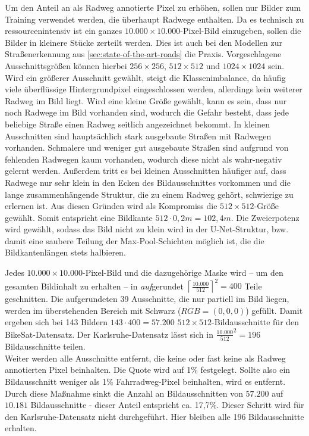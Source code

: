 Um den Anteil an als Radweg annotierte Pixel zu erhöhen, sollen nur Bilder zum Training verwendet werden,
die überhaupt Radwege enthalten. Da es technisch zu ressourcenintensiv ist ein ganzes 
$10.000{\times}10.000$-Pixel-Bild einzugeben, sollen die Bilder in kleinere Stücke zerteilt werden. 
Dies ist auch bei den Modellen zur Straßenerkennung aus \autoref{sec:state-of-the-art-roads} die Praxis. 
Vorgeschlagene Ausschnittsgrößen können hierbei $256{\times}256$, $512{\times}512$ und $1024{\times}1024$ sein. 
Wird ein größerer Ausschnitt gewählt, steigt die Klassenimbalance, da häufig viele überflüssige 
Hintergrundpixel eingeschlossen werden, allerdings kein weiterer Radweg im Bild liegt. 
Wird eine kleine Größe gewählt, kann es sein, dass nur noch Radwege im Bild vorhanden sind, 
wodurch die Gefahr besteht, dass jede beliebige Straße einen Radweg seitlich angezeichnet bekommt. 
In kleinen Ausschnitten sind hauptsächlich stark ausgebaute Straßen mit Radwegen vorhanden. 
Schmalere und weniger gut ausgebaute Straßen sind aufgrund von fehlenden Radwegen kaum vorhanden, wodurch diese nicht als wahr-negativ gelernt werden.  
Außerdem tritt es bei kleinen Ausschnitten häufiger auf, dass Radwege nur sehr klein in den Ecken des Bildausschnittes
vorkommen und die lange zusammenhängende Struktur, die zu einem Radweg gehört, schwierige zu erlernen ist. 
Aus diesen Gründen wird als Kompromiss die $512{\times}512$-Größe gewählt. Somit entspricht eine Bildkante 
$512 \cdot 0,2m = 102,4m$. Die Zweierpotenz wird gewählt, 
sodass das Bild nicht zu klein wird in der U-Net-Struktur, bzw. damit eine saubere Teilung der 
Max-Pool-Schichten möglich ist, die die Bildkantenlängen stets halbieren. 

Jedes $10.000{\times}10.000$-Pixel-Bild und die dazugehörige Maske wird -- um den gesamten Bildinhalt zu erhalten -- in \textit{auf}gerundet
$\left\lceil{\frac{10.000}{512}}\right\rceil^2 = 400$ Teile geschnitten. 
Die aufgerundeten 39 Ausschnitte, die nur partiell im Bild liegen, werden im überstehenden Bereich mit Schwarz ($RGB=(0,0,0)$) gefüllt.
Damit ergeben sich bei 143 Bildern $143 \cdot 400 = 57.200$ $512{\times}512$-Bildausschnitte für den BikeSat-Datensatz. 
Der Karlsruhe-Datensatz lässt sich in ${\frac{10.000}{512}}^2 = 196$ Bildausschnitte teilen.\\
Weiter werden alle Ausschnitte entfernt, die keine oder fast keine als Radweg annotierten Pixel beinhalten. 
Die Quote wird auf 1\% festgelegt. Sollte also ein Bildausschnitt weniger als 1\% Fahrradweg-Pixel beinhalten, 
wird es entfernt. Durch diese Maßnahme sinkt die Anzahl an Bildausschnitten von $57.200$ auf $10.181$ Bildausschnitte - 
dieser Anteil entspricht ca. 17,7\%. Dieser Schritt wird für den Karlsruhe-Datensatz nicht durchgeführt. Hier bleiben alle 196 
Bildausschnitte erhalten.
 

